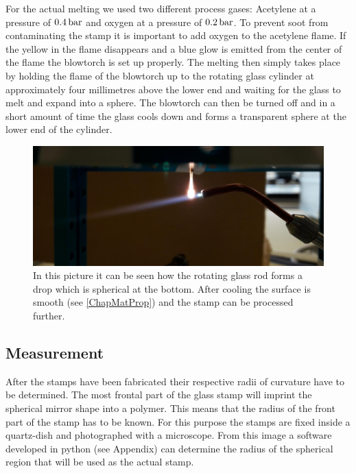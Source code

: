 For the actual melting we used two different process gases: Acetylene at a pressure of $0.4\cbar$ and oxygen at a pressure of $0.2\cbar$. To prevent soot from contaminating the stamp it is important to add oxygen to the acetylene flame. If the yellow in the flame disappears and a blue glow is emitted from the center of the flame the blowtorch is set up properly. The melting then simply takes place by holding the flame of the blowtorch up to the rotating glass cylinder at approximately four millimetres above the lower end and waiting for the glass to melt and expand into a sphere. The blowtorch can then be turned off and in a short amount of time the glass cools down and forms a transparent sphere at the lower end of the cylinder.
\begin{figure}[H]
	\includegraphics[scale=0.13]{source/melting}
	\caption{In this picture it can be seen how the rotating glass rod forms a drop which is spherical at the bottom. After cooling the surface is smooth (see \autoref{ChapMatProp}) and the stamp can be processed further.}
\end{figure}

\subsection{Measurement}\label{ChapMeasurement}
After the stamps have been fabricated their respective radii of curvature have to be determined. The most frontal part of the glass stamp will imprint the spherical mirror shape into a polymer. This means that the radius of the front part of the stamp has to be known. For this purpose the stamps are fixed inside a quartz-dish and photographed with a microscope. From this image a software developed in python (see Appendix) can determine the radius of the spherical region that will be used as the actual stamp.

